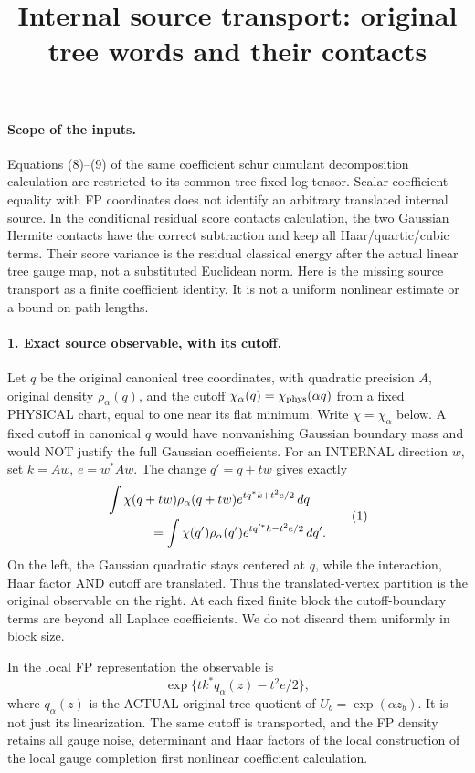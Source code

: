 \documentclass[11pt]{article}
\title{Internal source transport: original tree words and their contacts}\author{}\date{}
\begin{document}
\maketitle
\paragraph{Scope of the inputs.}
Equations (8)--(9) of the same coefficient schur cumulant decomposition calculation are restricted to its common-tree
fixed-log tensor. Scalar coefficient equality with FP coordinates
does not identify an arbitrary translated internal source.
In the conditional residual score contacts calculation, the two Gaussian Hermite contacts have the
correct subtraction and keep all Haar/quartic/cubic terms. Their
score variance is the residual classical energy after the actual
linear tree gauge map, not a substituted Euclidean norm.
Here is the missing source transport as a finite coefficient identity.
It is not a uniform nonlinear estimate or a bound on path lengths.

\paragraph{1. Exact source observable, with its cutoff.}
Let $q$ be the original canonical tree coordinates, with quadratic
precision $A$, original density $\rho_\alpha(q)$, and the cutoff
$\chi_\alpha(q)=\chi_{\rm phys}(\alpha q)$ from a fixed PHYSICAL
chart, equal to one near its flat minimum. Write $\chi=\chi_\alpha$
below. A fixed cutoff in canonical $q$ would have nonvanishing Gaussian
boundary mass and would NOT justify the full Gaussian coefficients.
For an INTERNAL direction
$w$, set $k=Aw$, $e=w^*Aw$. The change $q'=q+tw$ gives exactly
\[
 \begin{split}
 &\int\chi(q+tw)\rho_\alpha(q+tw)
             e^{tq^*k+t^2e/2}\,dq\\
 &\hspace{12mm}=\int\chi(q')\rho_\alpha(q')
             e^{tq'^*k-t^2e/2}\,dq'.
 \end{split} \tag{1}
\]
On the left, the Gaussian quadratic stays centered at $q$, while
the interaction, Haar factor AND cutoff are translated. Thus the
translated-vertex partition is the original observable on the right.
At each fixed finite block the cutoff-boundary terms are beyond all
Laplace coefficients. We do not discard them uniformly in block size.

In the local FP representation the observable is
\[
 \exp\{t k^*q_\alpha(z)-t^2e/2\}, \tag{2}
\]
where $q_\alpha(z)$ is the ACTUAL original tree quotient of
$U_b=\exp(\alpha z_b)$. It is not just its linearization.
The same cutoff is transported, and the FP density retains all gauge
noise, determinant and Haar factors of the local construction of the local gauge completion first nonlinear coefficient calculation.
\end{document}
